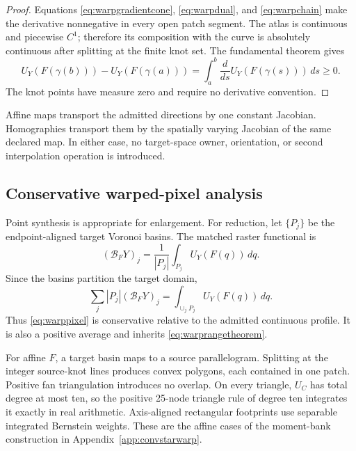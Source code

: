 \documentclass[journal]{IEEEtran}
\begin{document}
\begin{proof}
Equations \eqref{eq:warpgradientcone}, \eqref{eq:warpdual}, and
\eqref{eq:warpchain} make the derivative nonnegative in every open patch
segment.  The atlas is continuous and piecewise \(C^1\); therefore its
composition with the curve is absolutely continuous after splitting at the
finite knot set.  The fundamental theorem gives
\begin{equation}
 U_Y(F(\gamma(b)))-U_Y(F(\gamma(a)))
 =\int_a^b\frac{d}{ds}U_Y(F(\gamma(s)))\,ds\geq0.
\end{equation}
The knot points have measure zero and require no derivative convention.
\end{proof}

Affine maps transport the admitted directions by one constant Jacobian.
Homographies transport them by the spatially varying Jacobian of the same
declared map.  In either case, no target-space owner, orientation, or second
interpolation operation is introduced.

\subsection{Conservative warped-pixel analysis}

Point synthesis is appropriate for enlargement.  For reduction, let
\(\{P_j\}\) be the endpoint-aligned target Voronoi basins.  The matched
raster functional is
\begin{equation}
 (\mathcal B_FY)_j=
 \frac{1}{|P_j|}\int_{P_j}U_Y(F(q))\,dq.
 \label{eq:warppixel}
\end{equation}
Since the basins partition the target domain,
\begin{equation}
 \sum_j|P_j|(\mathcal B_FY)_j
 =\int_{\cup_jP_j}U_Y(F(q))\,dq.
 \label{eq:warpconservation}
\end{equation}
Thus \eqref{eq:warppixel} is conservative relative to the admitted continuous
profile.  It is also a positive average and inherits
\eqref{eq:warprangetheorem}.

For affine \(F\), a target basin maps to a source parallelogram. Splitting
at the integer source-knot lines produces convex polygons, each contained in
one patch. Positive fan triangulation introduces no overlap. On every
triangle, \(U_C\) has total degree at most ten, so the positive 25-node
triangle rule of degree ten integrates it exactly in real arithmetic.
Axis-aligned rectangular footprints use separable integrated Bernstein
weights. These are the affine cases of the moment-bank construction in
Appendix~\ref{app:convstarwarp}.
\end{document}

